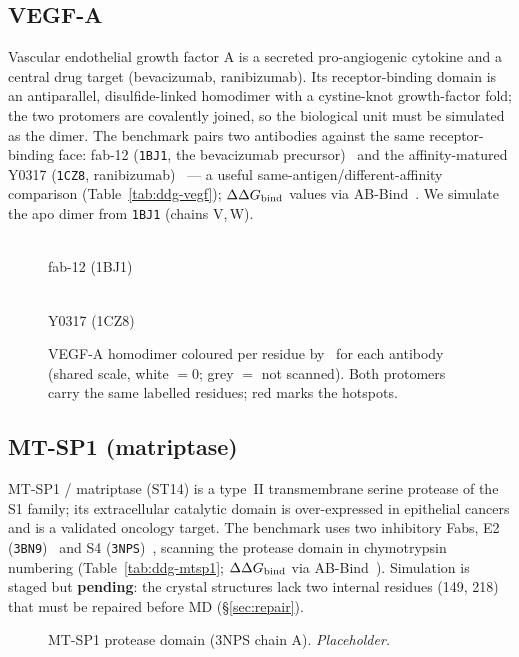 \subsection{VEGF-A}
Vascular endothelial growth factor A is a secreted pro-angiogenic cytokine and a central drug
target (bevacizumab, ranibizumab). Its receptor-binding domain is an antiparallel,
disulfide-linked homodimer with a cystine-knot growth-factor fold; the two protomers are
covalently joined, so the biological unit must be simulated as the dimer. The benchmark pairs two
antibodies against the same receptor-binding face: fab-12 (\texttt{1BJ1}, the bevacizumab
precursor)~\cite{muller1998} and the affinity-matured Y0317 (\texttt{1CZ8},
ranibizumab)~\cite{chen1999} --- a useful same-antigen/different-affinity comparison
(Table~\ref{tab:ddg-vegf}); $\Delta\Delta G_{\mathrm{bind}}$ values via AB-Bind~\cite{sirin2016}. We simulate the apo dimer
from \texttt{1BJ1} (chains V,\,W).
\begin{figure}[H]\centering
\begin{minipage}[c]{0.37\linewidth}\centering{}\\[-2pt]{\small fab-12 (1BJ1)}\end{minipage}\hfill
\begin{minipage}[c]{0.37\linewidth}\centering{}\\[-2pt]{\small Y0317 (1CZ8)}\end{minipage}\hfill
\begin{minipage}[c]{0.13\linewidth}\centering{}\end{minipage}
\caption{VEGF-A homodimer coloured per residue by \ddG\ for each antibody (shared scale, white $=0$; grey $=$ not scanned). Both protomers carry the same labelled residues; red marks the hotspots.}\end{figure}


\subsection{MT-SP1 (matriptase)}
MT-SP1 / matriptase (ST14) is a type~II transmembrane serine protease of the S1 family; its
extracellular catalytic domain is over-expressed in epithelial cancers and is a validated
oncology target. The benchmark uses two inhibitory Fabs, E2 (\texttt{3BN9})~\cite{farady2008} and S4
(\texttt{3NPS})~\cite{schneider2012}, scanning the protease domain in chymotrypsin numbering
(Table~\ref{tab:ddg-mtsp1}; $\Delta\Delta G_{\mathrm{bind}}$ via AB-Bind~\cite{sirin2016}). Simulation is
staged but \textbf{pending}: the crystal structures lack two internal residues (149, 218) that
must be repaired before MD (\S\ref{sec:repair}).
\begin{figure}[H]\centering{}
\caption{MT-SP1 protease domain (3NPS chain A). \textit{Placeholder.}}\end{figure}


